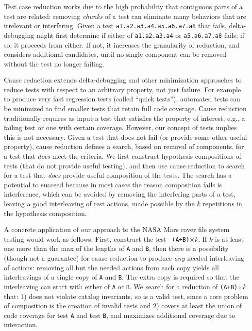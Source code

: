 Test case reduction \cite{DD} works due to the high probability that contiguous parts
of a test are related: removing \emph{chunks} of a test can
eliminate many behaviors that are irrelevant or interfering.  Given
a test {\tt a1.a2.a3.a4.a5.a6.a7.a8} that fails, delta-debugging 
might first determine if
either of {\tt a1.a2.a3.a4} or {\tt a5.a6.a7.a8} fails; if so, it
proceeds from either.  If not, it increases the granularity of
reduction, and considers additional candidates, until no single
component can be
removed without the test no longer failing.  

Cause reduction \cite{icst2014,stvrcausereduce} extends
delta-debugging and other minimization approaches to reduce tests with
respect to an arbitrary property, not just failure.  For example to produce very fast
regression tests (called ``quick tests''), automated tests can be
minimized to find smaller tests that retain full code coverage.    
Cause reduction traditionally requires as
input a test that satisfies the property of interest, e.g., a failing
test or one with certain coverage.  However, our concept of tests
implies this is not necessary.
Given a test that does not fail (or provide some other useful property), cause reduction defines a search, based on
removal of components, for a test that \emph{does} meet the criteria.  We
first construct hypothesis compositions of tests (that do not provide
useful testing), and then use cause reduction to search for a test that \emph{does}
provide useful composition of the tests.  The search has a potential
to succeed because in most cases the reason composition fails is
interference, which can be avoided by removing the interfering parts
of a test, leaving a good interleaving of test actions, made possible
by the $k$ repetitions in the hypothesis composition.

A concrete application of our approach to the NASA Mars rover file
system testing would work as follows.  First, construct the test {\tt
  (A+B)}$\times k$.  If $k$ is at least one more than the
max of the lengths of {\tt A} and {\tt B}, then there is a possibility
(though not a guarantee) for cause reduction to produce \emph{any} needed
interleaving of actions: removing all but the needed actions from each
copy yields all interleavings of a single copy of {\tt A} and {\tt B}.
The extra copy is required so that the interleaving can start with
either of {\tt A} or {\tt B}.  We search
for a reduction of {\tt (A+B)}$\times k$ that: 1) does not violate catalog invariants, so is a valid
test, since a core problem of composition is the creation of invalid
tests and 2) covers at least the union of code
coverage for test {\tt A} and test {\tt B}, and maximizes additional
coverage due to interaction.  

